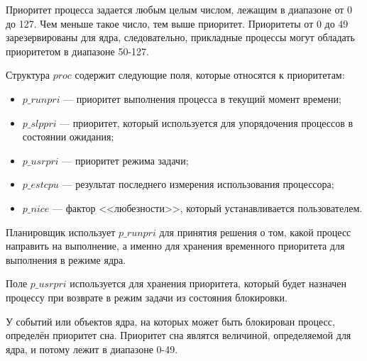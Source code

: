 Приоритет процесса задается любым целым числом, лежащим в диапазоне от 0 до 127. 
Чем меньше такое число, тем выше приоритет. 
Приоритеты от 0 до 49 зарезервированы для ядра, следовательно, прикладные процессы могут обладать приоритетом в диапазоне 50-127. 

Структура $proc$ содержит следующие поля, которые относятся к приоритетам:

\begin{itemize}[label*=--]
	\item $p\_runpri$ --- приоритет выполнения процесса в текущий момент времени;
	\item $p\_slppri$ --- приоритет, который используется для упорядочения процессов в состоянии ожидания;
	\item $p\_usrpri$ --- приоритет режима задачи;
	\item $p\_estcpu$ --- результат последнего измерения использования процессора;
	\item $p\_nice$ --- фактор <<любезности>>, который устанавливается пользователем.
\end{itemize}

Планировщик использует $p\_runpri$ для принятия решения о том, какой процесс направить на выполнение, а именно для хранения временного приоритета для выполнения в режиме ядра.

Поле $p\_usrpri$ используется для хранения приоритета, который будет назначен процессу при возврате в режим задачи из состояния блокировки. 

У событий или объектов ядра, на которых может быть блокирован процесс, определён приоритет сна. 
Приоритет сна являтся величиной, определяемой для ядра, и потому лежит в диапазоне 0-49.

\clearpage

